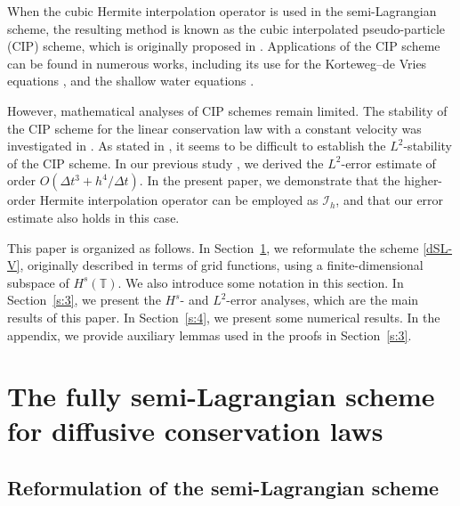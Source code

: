 \documentclass[10pt,a4paper,tbtags,leqno]{amsart}
\theoremstyle{definition}
\numberwithin{equation}{section}
\begin{document}
When the cubic Hermite interpolation operator is used in the semi-Lagrangian scheme, the resulting method is known as the cubic interpolated pseudo-particle (CIP) scheme, which is originally proposed in \cite{85TaNiYa}. Applications of the CIP scheme can be found in numerous works, including its use for the Korteweg--de Vries equations \cite{91YaAo}, and the shallow water equations \cite{09ToOgYa}. 

However, mathematical analyses of CIP schemes remain limited. The stability of the CIP scheme for the linear conservation law with a constant velocity was investigated in \cite{02NaTa, 15TaFuNiIs}. As stated in \cite{15TaFuNiIs}, it seems to be difficult to establish the $ L^2 $-stability of the CIP scheme. In our previous study \cite{24KaTa}, we derived the $ L^2 $-error estimate of order $ O(\Delta t^3 + h^4/\Delta t) $. In the present paper, we demonstrate that the higher-order Hermite interpolation operator can be employed as $ \mathcal{I}_h $, and that our error estimate also holds in this case. 

This paper is organized as follows. In Section~\ref{s:2}, we reformulate the scheme \eqref{dSL-V}, originally described in terms of grid functions, using a finite-dimensional subspace of $ H^s (\mathbb{T}) $. We also introduce some notation in this section. In Section~\ref{s:3}, we present the $ H^s $- and $ L^2 $-error analyses, which are the main results of this paper. In Section~\ref{s:4}, we present some numerical results. In the appendix, we provide auxiliary lemmas used in the proofs in Section~\ref{s:3}. 

\section{The fully semi-Lagrangian scheme for diffusive conservation laws} \label{s:2} 

\subsection{Reformulation of the semi-Lagrangian scheme} 
\end{document}
